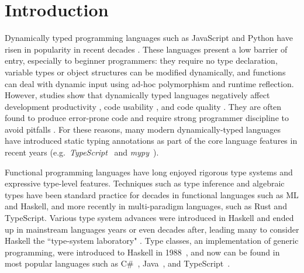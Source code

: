 

\section{Introduction}
Dynamically typed programming languages such as JavaScript and Python have risen in popularity in recent decades \cite{Chatley2019-uq}. These languages present a low barrier of entry, especially to beginner programmers: they require no type declaration, variable types or object structures can be modified dynamically, and functions can deal with dynamic input using ad-hoc polymorphism and runtime reflection. However, studies show that dynamically typed languages negatively affect development productivity \cite{Kleinschmager2012-bg}, code usability \cite{Mayer2012-lg}, and code quality \cite{Gao2017-xn, Ray2017-gq, Meyerovich2013-pn}. They are often found to produce error-prone code \cite{Chen2020-nq, Wang2015-rs, Xu2016-za} and require strong programmer discipline to avoid pitfalls \cite{Chen2020-nq}. For these reasons, many modern dynamically-typed languages have introduced static typing annotations as part of the core language features in recent years (e.g.\ \textit{TypeScript}~\cite{Microsoft_undated-ts} and \textit{mypy}~\cite{Mypy_undated-oe}).

Functional programming languages have long enjoyed rigorous type systems and expressive type-level features. Techniques such as type inference and algebraic types have been standard practice for decades in functional languages such as ML and Haskell, and more recently in multi-paradigm languages, such as Rust and TypeScript. Various type system advances were introduced in Haskell and ended up in mainstream languages years or even decades after, leading many to consider Haskell the ``type-system laboratory" \cite{Hudak2007-kn}.  Type classes, an implementation of generic programming, were introduced to Haskell in 1988~\cite{Hudak2007-kn}, and now can be found in most popular languages such as C\#~\cite{Bill_Wagner2022-sq}, Java~\cite{Oracle2022-lc}, and TypeScript~\cite{Microsoft2022-tl}.

